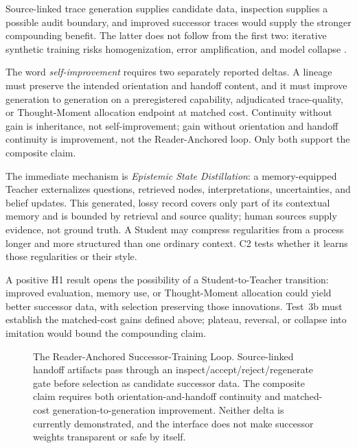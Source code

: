 \documentclass[11pt]{article}
\begin{document}
Source-linked trace generation supplies candidate data, inspection supplies a
possible audit boundary, and improved successor traces would supply the
stronger compounding benefit. The latter does not follow from the first two:
iterative synthetic training risks homogenization, error amplification, and
model collapse \cite{zelikman2022star,shumailov2023curse}.

		The word \emph{self-improvement} requires two separately reported deltas.
		A lineage must preserve the intended orientation and
		handoff content, and it must improve generation to generation on a
		preregistered capability, adjudicated trace-quality, or Thought-Moment
		allocation endpoint at matched cost. Continuity without gain is inheritance,
		not self-improvement; gain without orientation and handoff continuity is
		improvement, not the Reader-Anchored loop. Only both support the composite
		claim.

The immediate mechanism is \emph{Epistemic State Distillation}: a
memory-equipped Teacher externalizes questions, retrieved nodes,
interpretations, uncertainties, and belief updates. This generated, lossy
record covers only part of its contextual memory and is bounded by retrieval
and source quality; human sources supply evidence, not ground truth. A Student
may compress regularities from a process longer and more structured than one
ordinary context. C2 tests whether it learns those regularities or their style.

A positive H1 result opens the possibility of a Student-to-Teacher transition: improved
evaluation, memory use, or Thought-Moment allocation could yield better
successor data, with selection preserving those innovations. Test~3b must
establish the matched-cost gains defined above; plateau, reversal, or collapse
into imitation would bound the compounding claim.
	

		\begin{figure}[tbp]
			\centering
			\resizebox{0.94\textwidth}{!}{}
				\caption{The Reader-Anchored Successor-Training Loop. Source-linked handoff artifacts pass through an inspect/accept/reject/regenerate gate before selection as candidate successor data. The composite claim requires both orientation-and-handoff continuity and matched-cost generation-to-generation improvement. Neither delta is currently demonstrated, and the interface does not make successor weights transparent or safe by itself.}
				\label{fig:self-improvement}
			\end{figure}
\end{document}
